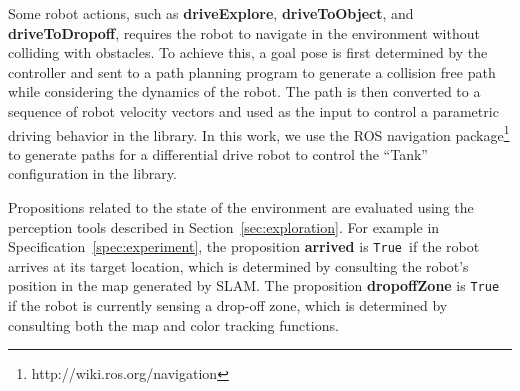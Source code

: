 \documentclass[conference]{IEEEtran}
\newcommand{\lt}{{\tt True }}
\begin{document}
Some robot actions, such as \textbf{driveExplore}, \textbf{driveToObject}, and \textbf{driveToDropoff}, requires the robot to navigate in the environment without colliding with obstacles.
To achieve this, a goal pose is first determined by the controller and sent to a path planning program to generate a collision free path while considering the dynamics of the robot.
The path is then converted to a sequence of robot velocity vectors and used as the input to control a parametric driving behavior in the library.
In this work, we use the ROS navigation package\footnote{http://wiki.ros.org/navigation} to generate paths for a differential drive robot to control the ``Tank'' configuration in the library.

Propositions related to the state of the environment are evaluated using the perception tools described in Section~\ref{sec:exploration}. For example in Specification~\ref{spec:experiment}, the proposition \textbf{arrived} is \lt if the robot arrives at its target location, which is determined by consulting the robot's position in the map generated by SLAM. The proposition \textbf{dropoffZone} is \lt if the robot is currently sensing a drop-off zone, which is determined by consulting both the map and color tracking functions.
\end{document}
